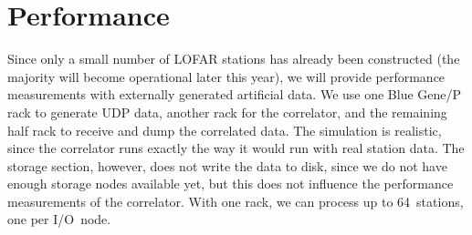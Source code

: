 \documentclass{sig-alternate}
\begin{document}



%
\label{sec:results}



\section{Performance}
\label{sec:performance}

Since only a small number of LOFAR stations has already been constructed
(the majority will become operational later this year), we will provide 
performance measurements with externally generated artificial data.
We use one Blue Gene/P rack to generate UDP data, another rack for the
correlator, and the remaining half rack to receive and dump the correlated
data.
The simulation is realistic, since the correlator runs exactly
the way it would run with real station data.
The storage section, however, does not write the data to disk, since we do
not have enough storage nodes available yet, but this does not influence the
performance measurements of the correlator.
With one rack, we can process up to 64~stations, one per I/O~node.
\end{document}
